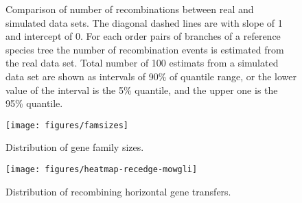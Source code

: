 \documentclass[english]{article}
\begin{document}
\begin{figure}


\caption{\label{fig:h2}Comparison of number of recombinations between real
and simulated data sets. The diagonal dashed lines are with
slope of 1 and intercept of 0. For each order pairs of branches of
a reference species tree the number of recombination events is estimated
from the real data set. Total number of 100 estimats from a simulated
data set are shown as intervals of 90\% of quantile range, or the
lower value of the interval is the 5\% quantile, and the upper one
is the 95\% quantile. }
\end{figure}
\clearpage{}%





\begin{figure}
\begin{center}
\texttt{[image: figures/famsizes]}
\end{center}
\vspace{-.3in}
\caption{Distribution of gene family sizes.}
\label{fig:famsize}
\end{figure}

\clearpage


\begin{figure}
\begin{center}
\texttt{[image: figures/heatmap-recedge-mowgli]}
\end{center}
\caption{Distribution of recombining horizontal gene transfers.}
\label{fig:mowgli-recomb-heatmap}
\end{figure}
\clearpage{}
\end{document}
